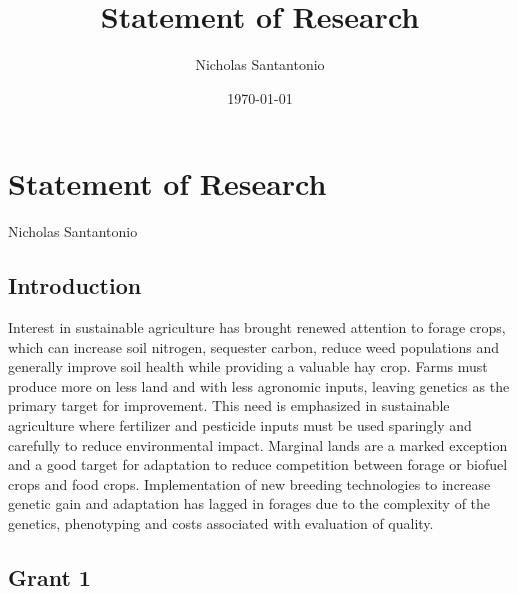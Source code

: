 \documentclass[10pt]{article}
\title{Statement of Research}
\author{Nicholas Santantonio}
\date{\today}
\begin{document}
\section*{\centering Statement of Research}
\begin{center} Nicholas Santantonio \end{center}

\subsection*{Introduction}






Interest in sustainable agriculture has brought renewed attention to forage crops, which can increase soil nitrogen, sequester carbon, reduce weed populations and generally improve soil health while providing a valuable hay crop. Farms must produce more on less land and with less agronomic inputs, leaving genetics as the primary target for improvement. This need is emphasized in sustainable agriculture where fertilizer and pesticide inputs must be used sparingly and carefully to reduce environmental impact. Marginal lands are a marked exception and a good target for adaptation to reduce competition between forage or biofuel crops and food crops. Implementation of new breeding technologies to increase genetic gain and adaptation has lagged in forages due to the complexity of the genetics, phenotyping and costs associated with evaluation of quality.



\subsection*{Grant 1}
\end{document}
